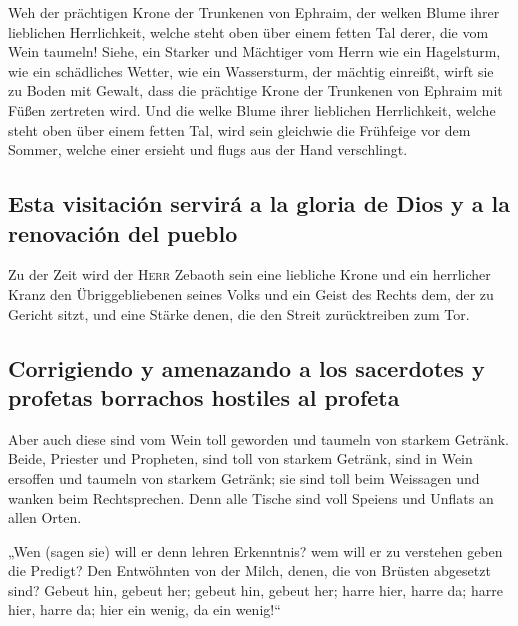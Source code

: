  Weh der prächtigen Krone der Trunkenen von Ephraim, der
welken Blume ihrer lieblichen Herrlichkeit, welche steht oben über einem
fetten Tal derer, die vom Wein taumeln!  Siehe, ein
Starker und Mächtiger vom Herrn wie ein Hagelsturm, wie ein schädliches
Wetter, wie ein Wassersturm, der mächtig einreißt, wirft sie zu Boden
mit Gewalt,  dass die prächtige Krone der Trunkenen von
Ephraim mit Füßen zertreten wird.  Und die welke Blume
ihrer lieblichen Herrlichkeit, welche steht oben über einem fetten Tal,
wird sein gleichwie die Frühfeige vor dem Sommer, welche einer ersieht
und flugs aus der Hand verschlingt.

\hypertarget{esta-visitaciuxf3n-serviruxe1-a-la-gloria-de-dios-y-a-la-renovaciuxf3n-del-pueblo}{%
\subsection{Esta visitación servirá a la gloria de Dios y a la
renovación del
pueblo}\label{esta-visitaciuxf3n-serviruxe1-a-la-gloria-de-dios-y-a-la-renovaciuxf3n-del-pueblo}}

 Zu der Zeit wird der \textsc{Herr} Zebaoth sein eine
liebliche Krone und ein herrlicher Kranz den Übriggebliebenen seines
Volks  und ein Geist des Rechts dem, der zu Gericht sitzt,
und eine Stärke denen, die den Streit zurücktreiben zum Tor.

\hypertarget{corrigiendo-y-amenazando-a-los-sacerdotes-y-profetas-borrachos-hostiles-al-profeta}{%
\subsection{Corrigiendo y amenazando a los sacerdotes y profetas
borrachos hostiles al
profeta}\label{corrigiendo-y-amenazando-a-los-sacerdotes-y-profetas-borrachos-hostiles-al-profeta}}

 Aber auch diese sind vom Wein toll geworden und taumeln
von starkem Getränk. Beide, Priester und Propheten, sind toll von
starkem Getränk, sind in Wein ersoffen und taumeln von starkem Getränk;
sie sind toll beim Weissagen und wanken beim Rechtsprechen.
 Denn alle Tische sind voll Speiens und Unflats an allen
Orten.

 „Wen (sagen sie) will er denn lehren Erkenntnis? wem will
er zu verstehen geben die Predigt? Den Entwöhnten von der Milch, denen,
die von Brüsten abgesetzt sind?  Gebeut hin, gebeut her;
gebeut hin, gebeut her; harre hier, harre da; harre hier, harre da; hier
ein wenig, da ein wenig!{}``

